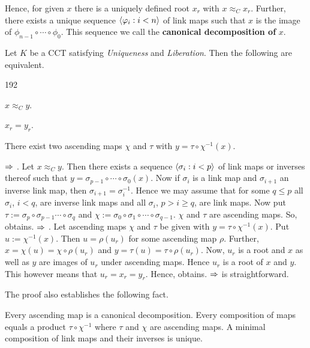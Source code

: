 Hence, for given $x$ there is a uniquely defined root $x_r$ with
$x \approx_C x_r$. Further, there exists a unique sequence 
$\langle \varphi_i : i < n\rangle$ of link maps such that $x$ is the image 
of $\phi_{n-1} \circ \dotsb \circ \phi_0$. This sequence we call 
the \textbf{canonical decomposition of} $x$.
\begin{prop}
Let $K$ be a CCT satisfying {\sl Uniqueness} and {\sl Liberation}.
Then the following are equivalent.
\begin{dingautolist}{192}
\item
$x \approx_C y$.
\item
$x_r = y_r$.
\item
There exist two ascending maps $\chi$ and $\tau$
with $y = \tau \circ \chi^{-1}(x)$.
\end{dingautolist}
\end{prop}
\proofbeg
{} $\Rightarrow$ . Let $x \approx_C y$.
Then there exists a sequence $\langle \sigma_i : i < p\rangle$ of link 
maps or inverses thereof such that 
$y = \sigma_{p-1} \circ \dotsb \circ \sigma_0(x)$.
Now if $\sigma_{i}$ is a link map and $\sigma_{i+1}$ an inverse
link map, then $\sigma_{i+1} = \sigma_{i}^{-1}$. Hence we may
assume that for some $q \leq p$ all $\sigma_i$, $i < q$,
are inverse link maps and all $\sigma_i$, $p > i \geq q$,
are link maps. Now put $\tau := \sigma_{p} \circ \sigma_{p-1}
\dotsb \circ \sigma_q$ and $\chi := \sigma_0 \circ \sigma_{1}
\circ \dotsb \circ \sigma_{q-1}$. $\chi$ and $\tau$ are ascending
maps. So,  obtains.  $\Rightarrow$ . Let 
ascending maps $\chi$ and $\tau$ be given with 
$y = \tau \circ \chi^{-1}(x)$.
Put $u := \chi^{-1}(x)$. Then $u = \rho(u_r)$ for some
ascending map $\rho$. Further, $x = \chi(u) = \chi \circ %
\rho(u_r)$ and $y = \tau(u) = \tau \circ \rho(u_r)$.
Now, $u_r$ is a root and $x$ as well as $y$ are images of
$u_r$ under ascending maps. Hence $u_r$ is a root of $x$
and $y$. This however means that $u_r = x_r = y_r$. Hence,
 obtains.  $\Rightarrow$  is straightforward.
\proofend

The proof also establishes the following fact.
\begin{lem}
Every ascending map is a canonical decomposition.
Every composition of maps equals a product $\tau \circ \chi^{-1}$
where $\tau$ and $\chi$ are ascending maps.
A minimal composition of link maps and their inverses is
unique.
\end{lem}

